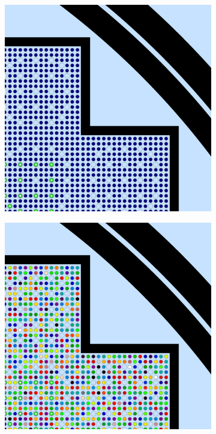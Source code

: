 \begin{figure}[h!]
\begin{subfigure}{.45\textwidth}
  \caption{}
  \label{fig:chap8-2x2-degenerate-materials}
\end{subfigure}
\begin{subfigure}{.45\textwidth}
  \centering
  \includegraphics[width=0.87\linewidth]{figures/quantification/homogenization/full-core-null-materials}
  \caption{}
  \label{fig:chap8-full-core-null-materials}
\end{subfigure}%
\begin{subfigure}{.45\textwidth}
  \centering
  \includegraphics[width=0.87\linewidth]{figures/quantification/homogenization/full-core-degenerate-materials}

\end{subfigure}
\end{figure}
